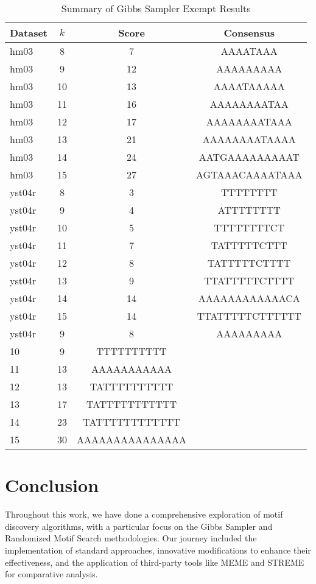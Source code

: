 \documentclass{report}
\begin{document}
\begin{table}[htbp]
\centering
\caption{Summary of Gibbs Sampler Exempt Results}
\label{tab:gibbs-exempt-summary}
\begin{tabular}{@{}lccc@{}}
\toprule
\textbf{Dataset} & \textbf{\(k\)} & \textbf{Score} & \textbf{Consensus} \\ \midrule
hm03 & 8 & 7 & AAAATAAA \\
hm03 & 9 & 12 & AAAAAAAAA \\
hm03 & 10 & 13 & AAAATAAAAA \\
hm03 & 11 & 16 & AAAAAAAATAA \\
hm03 & 12 & 17 & AAAAAAAATAAA \\
hm03 & 13 & 21 & AAAAAAAATAAAA \\
hm03 & 14 & 24 & AATGAAAAAAAAAT \\
hm03 & 15 & 27 & AGTAAACAAAATAAA \\
yst04r & 8 & 3 & TTTTTTTT \\
yst04r & 9 & 4 & ATTTTTTTT \\
yst04r & 10 & 5 & TTTTTTTTCT \\
yst04r & 11 & 7 & TATTTTTCTTT \\
yst04r & 12 & 8 & TATTTTTCTTTT \\
yst04r & 13 & 9 & TTATTTTTCTTTT \\
yst04r & 14 & 14 & AAAAAAAAAAAACA \\
yst04r & 15 & 14 & TTATTTTTCTTTTTT \\
yst04r &9 & 8 & AAAAAAAAA \\
10 & 9 & TTTTTTTTTT \\
11 & 13 & AAAAAAAAAAA \\
12 & 13 & TATTTTTTTTTT \\
13 & 17 & TATTTTTTTTTTT \\
14 & 23 & TATTTTTTTTTTTT \\
15 & 30 & AAAAAAAAAAAAAAA \\
\bottomrule
\end{tabular}
\end{table}
    
\chapter{Conclusion}


Throughout this work, we have done a comprehensive exploration of motif discovery algorithms, with a particular focus on the Gibbs Sampler and Randomized Motif Search methodologies. Our journey included the implementation of standard approaches, innovative modifications to enhance their effectiveness, and the application of third-party tools like MEME and STREME for comparative analysis.
\end{document}
